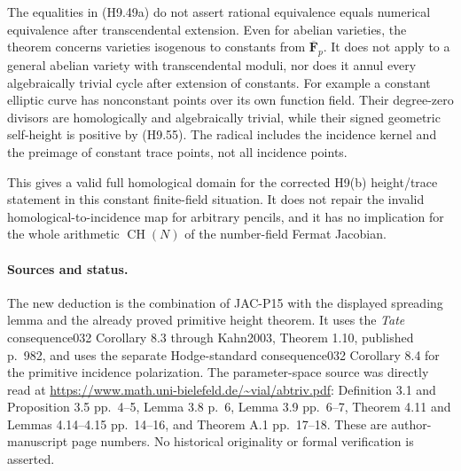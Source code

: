 The equalities in (H9.49a) do not assert rational equivalence equals
numerical equivalence after transcendental extension. Even for
abelian varieties, the theorem concerns varieties isogenous
to constants from $\overline{\mathbf F}_p$. It does not apply to a
general abelian variety with transcendental moduli, nor does it
annul every algebraically trivial cycle after extension of constants.
For example a constant elliptic curve has nonconstant points over
its own function field. Their degree-zero divisors are homologically
and algebraically trivial, while their signed geometric self-height
is positive by (H9.55). The radical includes the incidence kernel
and the preimage of constant trace points, not all incidence points.

This gives a valid full homological domain for the corrected H9(b)
height/trace statement in this constant finite-field situation. It
does not repair the invalid homological-to-incidence map for arbitrary
pencils, and it has no implication for the whole arithmetic
$\operatorname{CH}(N)$ of the number-field Fermat Jacobian.

\paragraph{Sources and status.}
The new deduction is the combination of JAC-P15 with the displayed
spreading lemma and the already proved primitive height theorem.
It uses the \emph{Tate} consequence032 Corollary 8.3 through
Kahn2003, Theorem 1.10, published p.~982, and uses the separate
Hodge-standard consequence032 Corollary 8.4 for the primitive
incidence polarization. The parameter-space source was directly read
at \url{https://www.math.uni-bielefeld.de/~vial/abtriv.pdf}:
Definition 3.1 and Proposition 3.5 pp.~4--5, Lemma 3.8 p.~6,
Lemma 3.9 pp.~6--7, Theorem 4.11 and Lemmas 4.14--4.15 pp.~14--16,
and Theorem A.1 pp.~17--18. These are author-manuscript page numbers.
No historical originality or formal verification is asserted.
